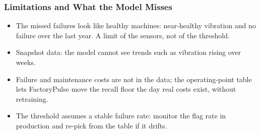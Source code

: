 \documentclass{beamer}
\begin{document}
    \begin{frame}
        \frametitle{Limitations and What the Model Misses}
        \begin{itemize}
            \item The missed failures look like healthy machines: near-healthy vibration and no failure over the last year. A limit of the sensors, not of the threshold.
            \item Snapshot data: the model cannot see trends such as vibration rising over weeks.
            \item Failure and maintenance costs are not in the data; the operating-point table lets FactoryPulse move the recall floor the day real costs exist, without retraining.
            \item The threshold assumes a stable failure rate: monitor the flag rate in production and re-pick from the table if it drifts.
        \end{itemize}
    \end{frame}
\end{document}
